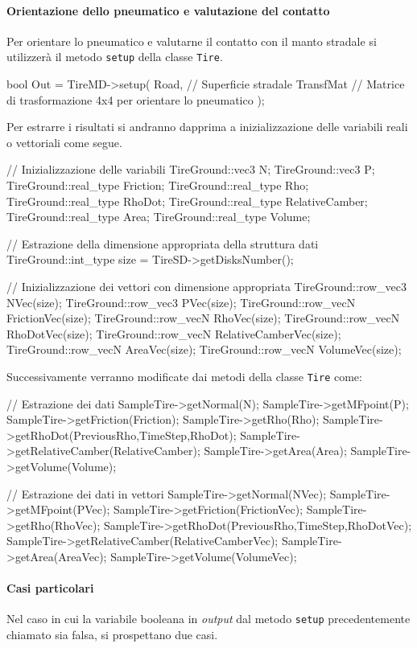 \paragraph{Orientazione dello pneumatico e valutazione del contatto}
Per orientare lo pneumatico e valutarne il contatto con il manto stradale si utilizzerà il metodo \texttt{setup} della classe \texttt{Tire}.
\begin{pseudoc}
bool Out = TireMD->setup(
	Road,     // Superficie stradale
	TransfMat // Matrice di trasformazione 4x4 per orientare lo pneumatico
	);
\end{pseudoc}
Per estrarre i risultati si andranno dapprima a inizializzazione delle variabili reali o vettoriali come segue.
\begin{pseudoc}
	// Inizializzazione delle variabili
	TireGround::vec3 N;
	TireGround::vec3 P;
	TireGround::real_type Friction;
	TireGround::real_type Rho;
	TireGround::real_type RhoDot;
	TireGround::real_type RelativeCamber;
	TireGround::real_type Area;
	TireGround::real_type Volume;
	
	// Estrazione della dimensione appropriata della struttura dati
	TireGround::int_type size = TireSD->getDisksNumber();
	
	// Inizializzazione dei vettori con dimensione appropriata
	TireGround::row_vec3 NVec(size);
	TireGround::row_vec3 PVec(size);
	TireGround::row_vecN FrictionVec(size);
	TireGround::row_vecN RhoVec(size);
	TireGround::row_vecN RhoDotVec(size);
	TireGround::row_vecN RelativeCamberVec(size);
	TireGround::row_vecN AreaVec(size);
	TireGround::row_vecN VolumeVec(size);
\end{pseudoc}
Successivamente verranno modificate dai metodi della classe \texttt{Tire} come:
\begin{pseudoc}
	// Estrazione dei dati
	SampleTire->getNormal(N);
	SampleTire->getMFpoint(P);
	SampleTire->getFriction(Friction);
	SampleTire->getRho(Rho);
	SampleTire->getRhoDot(PreviousRho,TimeStep,RhoDot);
	SampleTire->getRelativeCamber(RelativeCamber);
	SampleTire->getArea(Area);
	SampleTire->getVolume(Volume);
	
	// Estrazione dei dati in vettori
	SampleTire->getNormal(NVec);
	SampleTire->getMFpoint(PVec);
	SampleTire->getFriction(FrictionVec);
	SampleTire->getRho(RhoVec);
	SampleTire->getRhoDot(PreviousRho,TimeStep,RhoDotVec);
	SampleTire->getRelativeCamber(RelativeCamberVec);
	SampleTire->getArea(AreaVec);
	SampleTire->getVolume(VolumeVec);
\end{pseudoc}
%
\paragraph{Casi particolari}
Nel caso in cui la variabile booleana in \textit{output} dal metodo \texttt{setup} precedentemente chiamato sia falsa, si prospettano due casi.
%
